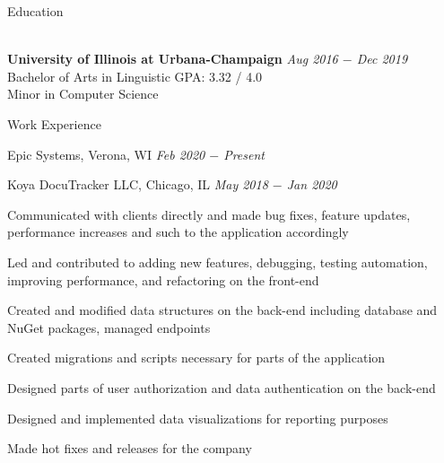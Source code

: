\documentclass{resume}
\begin{document}
\begin{rSection}{Education}

\\{\bf University of Illinois at Urbana-Champaign} \hfill {\em Aug 2016 $-$ Dec 2019} 
\\ Bachelor of Arts in Linguistic\hfill { GPA: 3.32 / 4.0 }
\\ Minor in Computer Science
\end{rSection}

\begin{rSection}{Work Experience}

\begin{rSubsection}{Epic Systems, Verona, WI} {\textit{Feb 2020 $-$ Present}}
{}

\end{rSubsection}

\begin{rSubsection}{Koya DocuTracker LLC, Chicago, IL} {\textit{May 2018 $-$ Jan 2020}}
{}

    \item Communicated with clients directly and made bug fixes, feature updates, performance increases and such to the application accordingly
    \item Led and contributed to adding new features, debugging, testing automation, improving performance, and refactoring on the front-end
    \item Created and modified data structures on the back-end including database and NuGet packages, managed endpoints
    \item Created migrations and scripts necessary for parts of the application
    \item Designed parts of user authorization and data authentication on the back-end
    \item Designed and implemented data visualizations for reporting purposes
    \item Made hot fixes and releases for the company

\end{rSubsection}

\end{rSection}
\end{document}
